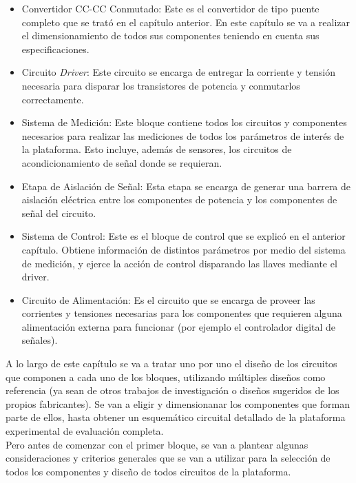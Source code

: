 \begin{itemize}
    \item {\SemiBold Convertidor CC-CC Conmutado:} Este es el convertidor de tipo puente completo que se trató en el capítulo anterior. En este capítulo se va a realizar el dimensionamiento de todos sus componentes teniendo en cuenta sus especificaciones. 
    \item {\SemiBold Circuito \textit{Driver}:} Este circuito se encarga de entregar la corriente y tensión necesaria para disparar los transistores de potencia y conmutarlos correctamente.
    \item {\SemiBold Sistema de Medición:} Este bloque contiene todos los circuitos y componentes necesarios para realizar las mediciones de todos los parámetros de interés de la plataforma. Esto incluye, además de sensores, los circuitos de acondicionamiento de señal donde se requieran.
    \item {\SemiBold Etapa de Aislación de Señal:} Esta etapa se encarga de generar una barrera de aislación eléctrica entre los componentes de potencia y los componentes de señal del circuito.
    \item {\SemiBold Sistema de Control:} Este es el bloque de control que se explicó en el anterior capítulo. Obtiene información de distintos parámetros por medio del sistema de medición, y ejerce la acción de control disparando las llaves mediante el driver.
    \item {\SemiBold Circuito de Alimentación:} Es el circuito que se encarga de proveer las corrientes y tensiones necesarias para los componentes que requieren alguna alimentación externa para funcionar (por ejemplo el controlador digital de señales).\\
\end{itemize}

A lo largo de este capítulo se va a tratar uno por uno el diseño de los circuitos que componen a cada uno de los bloques, utilizando múltiples diseños como referencia (ya sean de otros trabajos de investigación o diseños sugeridos de los propios fabricantes). Se van a eligir y dimensionanar los componentes que forman parte de ellos, hasta obtener un esquemático circuital detallado de la plataforma experimental de evaluación completa.\\

Pero antes de comenzar con el primer bloque, se van a plantear algunas consideraciones y criterios generales que se van a utilizar para la selección de todos los componentes y diseño de todos circuitos de la plataforma.\\

